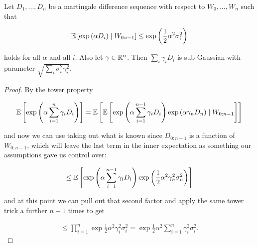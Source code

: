 \documentclass[11pt]{scrartcl}
\begin{document}
\begin{theorem}
Let $D_1, ... , D_n$ be a martingale difference sequence with respect to $W_0, ... , W_n$ such that 

\begin{equation}
    \mathbb{E} \left[ \text{exp} \left( \alpha D_i \right) \mid W_{0:i-1} \right] \le \text{exp} \left( \frac12 \alpha^2 \sigma_i^2 \right)
\end{equation}

holds for all $\alpha$ and all $i$. Also let $\gamma \in \mathbb R^n$. Then $\sum_i \gamma_i D_i$ is sub-Gaussian with parameter $\sqrt{\sum_i \sigma_i^2 \gamma_i^2}$.

\begin{proof}
By the tower property 

\begin{equation}
    \mathbb{E} \left[ \text{exp} \left( \alpha \sum_{i=1}^n \gamma_i D_i \right) \right] = \mathbb{E} \left[ \mathbb{E} \left[ \text{exp} \left( \alpha \sum_{i=1}^{n-1} \gamma_i D_i \right)\text{exp} \left( \alpha \gamma_n D_n \right) \mid W_{0:n-1} \right] \right]
\end{equation}

and now we can use taking out what is known since $D_{0:n-1}$ is a function of $W_{0:n-1}$, which will leave the last term in the inner expectation as something our assumptions gave us control over:

\begin{align}
    \le \mathbb{E} \left[  \text{exp} \left( \alpha \sum_{i=1}^{n-1} \gamma_i D_i \right) \text{exp} \left(  \frac12 \alpha^2 \gamma_n^2 \sigma_n^2 \right) \right]
\end{align}

and at this point we can pull out that second factor and apply the same tower trick a further $n-1$ times to get

\begin{align}
    \le \prod_{i=1}^n \exp{\frac12 \alpha^2 \gamma_i^2 \sigma_i^2} = \exp{\frac12 \alpha^2 \sum_{i=1}^n \gamma_i^2 \sigma_i^2}.
\end{align}
\end{proof}
\label{L5: linear combo martingale}
\end{theorem}
\end{document}
